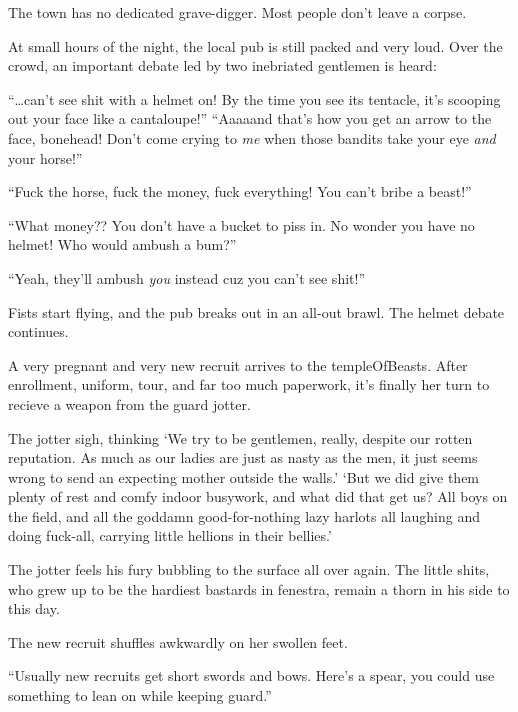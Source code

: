 \begin{multicols}{2}
\begin{exampletext}
  The town has no dedicated grave-digger.
  Most people don't leave a corpse.
\end{exampletext}

\begin{exampletext}
  At small hours of the night, the local pub is still packed and very loud.
  Over the crowd, an important debate led by two inebriated gentlemen is heard:

  ``\ldots can't
  see shit with a helmet on!
  By the time you see its tentacle, it's scooping out your face like a cantaloupe!''
  ``Aaaaand that's how you get an arrow to the face, bonehead!
  Don't come crying to \emph{me} when those bandits take your eye \emph{and} your horse!''

  ``Fuck the horse, fuck the money, fuck everything!
  You can't bribe a beast!''

  ``What money??
  You don't have a bucket to piss in.
  No wonder you have no helmet!
  Who would ambush a bum?''

  ``Yeah, they'll ambush \emph{you} instead cuz you can't see shit!''

  Fists start flying, and the pub breaks out in an all-out brawl.
  The helmet debate continues.
\end{exampletext}

\begin{exampletext}
  A very pregnant and very new recruit arrives to the \gls{templeOfBeasts}.
  After enrollment, uniform, tour, and far too much paperwork, it's finally her turn to recieve a weapon from the \gls{guard} \gls{jotter}.

  The \gls{jotter} sigh, thinking `We try to be gentlemen, really, despite our rotten reputation.
  As much as our ladies are just as nasty as the men, it just seems wrong to send an expecting mother outside the walls.'
  `But we did give them plenty of rest and comfy indoor busywork, and what did that get us?
  All boys on the field, and all the goddamn good-for-nothing lazy harlots all laughing and doing fuck-all, carrying little hellions in their bellies.'

  The \gls{jotter} feels his fury bubbling to the surface all over again.
  The little shits, who grew up to be the hardiest bastards in \gls{fenestra}, remain a thorn in his side to this day.

  The new recruit shuffles awkwardly on her swollen feet.

  ``Usually new recruits get short swords and bows.
  Here's a spear, you could use something to lean on while keeping guard.''


\end{exampletext}
\end{multicols}
